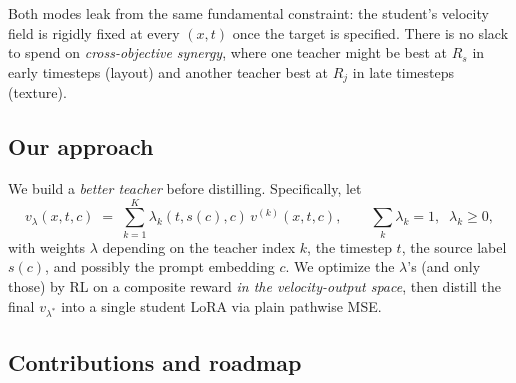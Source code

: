 \documentclass[11pt,a4paper]{article}
\theoremstyle{definition}
\begin{document}
Both modes leak from the same fundamental constraint: the student's
velocity field is rigidly fixed at every $(x,t)$ once the target is
specified. There is no slack to spend on \emph{cross-objective synergy},
where one teacher might be best at $R_s$ in early timesteps (layout) and
another teacher best at $R_j$ in late timesteps (texture).

\subsection{Our approach}

We build a \emph{better teacher} before distilling. Specifically,
let
\begin{equation}
v_\lambda(x,t,c) \;=\; \sum_{k=1}^{K}\lambda_{k}(t,s(c),c)\,v^{(k)}(x,t,c),
\qquad
\sum_k \lambda_k = 1,\;\;\lambda_k\geq 0,
\label{eq:mof_intro}
\end{equation}
with weights $\lambda$ depending on the teacher index $k$, the timestep $t$,
the source label $s(c)$, and possibly the prompt embedding $c$. We
optimize the $\lambda$'s (and only those) by RL on a composite reward
\emph{in the velocity-output space}, then distill the final $v_{\lambda^*}$
into a single student LoRA via plain pathwise MSE.

\subsection{Contributions and roadmap}
\end{document}
